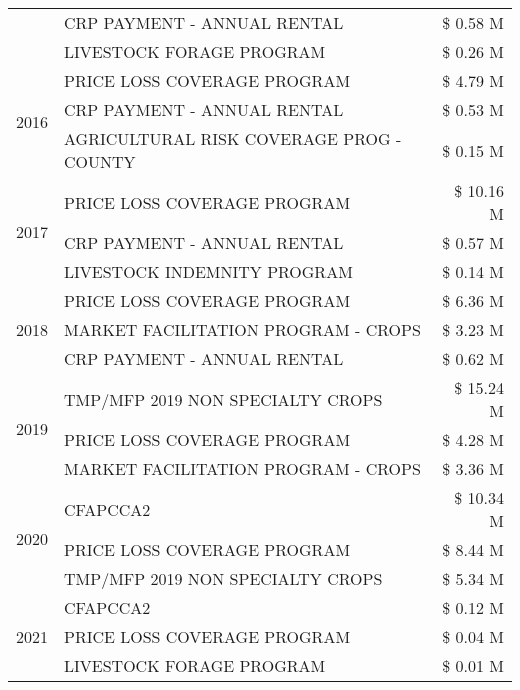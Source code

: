 \begin{tabular}{llr}
 & CRP PAYMENT - ANNUAL RENTAL & \$ 0.58 M \\
 & LIVESTOCK FORAGE PROGRAM & \$ 0.26 M \\
\cline{1-3}
\multirow[t]{3}{*}{2016} & PRICE LOSS COVERAGE PROGRAM & \$ 4.79 M \\
 & CRP PAYMENT - ANNUAL RENTAL & \$ 0.53 M \\
 & AGRICULTURAL RISK COVERAGE PROG - COUNTY & \$ 0.15 M \\
\cline{1-3}
\multirow[t]{3}{*}{2017} & PRICE LOSS COVERAGE PROGRAM & \$ 10.16 M \\
 & CRP PAYMENT - ANNUAL RENTAL & \$ 0.57 M \\
 & LIVESTOCK INDEMNITY PROGRAM & \$ 0.14 M \\
\cline{1-3}
\multirow[t]{3}{*}{2018} & PRICE LOSS COVERAGE PROGRAM & \$ 6.36 M \\
 & MARKET FACILITATION PROGRAM - CROPS & \$ 3.23 M \\
 & CRP PAYMENT - ANNUAL RENTAL & \$ 0.62 M \\
\cline{1-3}
\multirow[t]{3}{*}{2019} & TMP/MFP 2019 NON SPECIALTY CROPS & \$ 15.24 M \\
 & PRICE LOSS COVERAGE PROGRAM & \$ 4.28 M \\
 & MARKET FACILITATION PROGRAM - CROPS & \$ 3.36 M \\
\cline{1-3}
\multirow[t]{3}{*}{2020} & CFAPCCA2 & \$ 10.34 M \\
 & PRICE LOSS COVERAGE PROGRAM & \$ 8.44 M \\
 & TMP/MFP 2019 NON SPECIALTY CROPS & \$ 5.34 M \\
\cline{1-3}
\multirow[t]{3}{*}{2021} & CFAPCCA2 & \$ 0.12 M \\
 & PRICE LOSS COVERAGE PROGRAM & \$ 0.04 M \\
 & LIVESTOCK FORAGE PROGRAM & \$ 0.01 M \\
\cline{1-3}
\bottomrule
\end{tabular}
